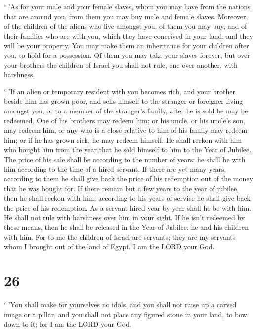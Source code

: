  ``\,'As for your male and your female slaves, whom you may
have from the nations that are around you, from them you may buy male
and female slaves.  Moreover, of the children of the aliens
who live amongst you, of them you may buy, and of their families who are
with you, which they have conceived in your land; and they will be your
property.  You may make them an inheritance for your
children after you, to hold for a possession. Of them you may take your
slaves forever, but over your brothers the children of Israel you shall
not rule, one over another, with harshness.

 ``\,'If an alien or temporary resident with you becomes
rich, and your brother beside him has grown poor, and sells himself to
the stranger or foreigner living amongst you, or to a member of the
stranger's family,  after he is sold he may be redeemed.
One of his brothers may redeem him;  or his uncle, or his
uncle's son, may redeem him, or any who is a close relative to him of
his family may redeem him; or if he has grown rich, he may redeem
himself.  He shall reckon with him who bought him from the
year that he sold himself to him to the Year of Jubilee. The price of
his sale shall be according to the number of years; he shall be with him
according to the time of a hired servant.  If there are yet
many years, according to them he shall give back the price of his
redemption out of the money that he was bought for.  If
there remain but a few years to the year of jubilee, then he shall
reckon with him; according to his years of service he shall give back
the price of his redemption.  As a servant hired year by
year shall he be with him. He shall not rule with harshness over him in
your sight.  If he isn't redeemed by these means, then he
shall be released in the Year of Jubilee: he and his children with him.
 For to me the children of Israel are servants; they are my
servants whom I brought out of the land of Egypt. I am the LORD your
God.

\hypertarget{section-25}{%
\section{26}\label{section-25}}

 ``\,'You shall make for yourselves no idols, and you shall
not raise up a carved image or a pillar, and you shall not place any
figured stone in your land, to bow down to it; for I am the LORD your
God.

